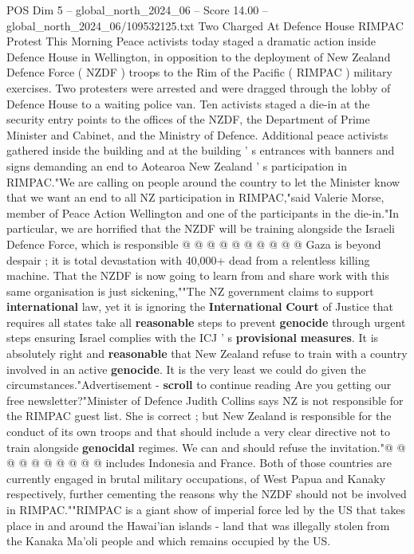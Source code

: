 \begin{textsample}{POS Dim 5 – global\_north\_2024\_06 – Score 14.00 – global\_north\_2024\_06/109532125.txt}  \label{ex:f5_pos_319}
Two Charged At Defence House RIMPAC Protest This Morning Peace activists today staged a dramatic action inside Defence House in Wellington, in opposition to the deployment of New Zealand Defence Force ( NZDF ) troops to the Rim of the Pacific ( RIMPAC ) military exercises.
Two protesters were arrested and were dragged through the lobby of Defence House to a waiting police van.
Ten activists staged a die-in at the security entry points to the offices of the NZDF, the Department of Prime Minister and Cabinet, and the Ministry of Defence.
Additional peace activists gathered inside the building and at the building ' s entrances with banners and signs demanding an end to Aotearoa New Zealand ' s participation in RIMPAC."We are calling on people around the country to let the Minister know that we want an end to all NZ participation in RIMPAC,"said Valerie Morse, member of Peace Action Wellington and one of the participants in the die-in."In particular, we are horrified that the NZDF will be training alongside the Israeli Defence Force, which is responsible @ @ @ @ @ @ @ @ @ @ Gaza is beyond despair ; it is total devastation with 40,000+ dead from a relentless killing machine.
That the NZDF is now going to learn from and share work with this same organisation is just sickening,""The NZ government claims to support \textbf{international} law, yet it is ignoring the \textbf{International} \textbf{Court} of Justice that requires all states take all \textbf{reasonable} steps to prevent \textbf{genocide} through urgent steps ensuring Israel complies with the ICJ ' s \textbf{provisional} \textbf{measures}.
It is absolutely right and \textbf{reasonable} that New Zealand refuse to train with a country involved in an active \textbf{genocide}.
It is the very least we could do given the circumstances."Advertisement - \textbf{scroll} to continue reading Are you getting our free newsletter?"Minister of Defence Judith Collins says NZ is not responsible for the RIMPAC guest list.
She is correct ; but New Zealand is responsible for the conduct of its own troops and that should include a very clear directive not to train alongside \textbf{genocidal} regimes.
We can and should refuse the invitation."@ @ @ @ @ @ @ @ @ @ includes Indonesia and France.
Both of those countries are currently engaged in brutal military occupations, of West Papua and Kanaky respectively, further cementing the reasons why the NZDF should not be involved in RIMPAC.""RIMPAC is a giant show of imperial force led by the US that takes place in and around the Hawai'ian islands - land that was illegally stolen from the Kanaka Ma'oli people and which remains occupied by the US.

\end{textsample}
